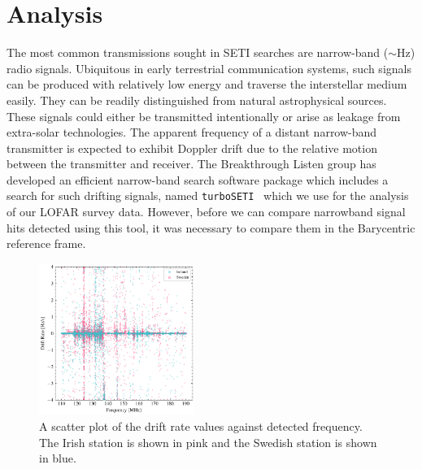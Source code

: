 \section{Analysis}
\label{sect:signal_types}
The most common transmissions sought in SETI searches are narrow-band ($\sim$Hz) radio signals. Ubiquitous in early terrestrial communication systems, such signals can be produced with relatively low energy and traverse the interstellar medium easily. They can be readily distinguished from natural astrophysical sources. These signals could either be transmitted intentionally or arise as leakage from extra-solar technologies. The apparent frequency of a distant narrow-band transmitter is expected to exhibit Doppler drift due to the relative motion between the transmitter and receiver. 
The Breakthrough Listen group has developed an efficient narrow-band search software package which includes a search for such drifting signals, named \verb|turboSETI|~\citep{Enriquez:2017} which we use for the analysis of our LOFAR survey data. However, before we can compare narrowband signal hits detected using this tool, it was necessary to compare them in the Barycentric reference frame. 

\begin{figure}
    \centering
    \includegraphics[width = 0.45\textwidth]{SETI/figures/narrowband/DR_scatter_plot.pdf}
    \caption{A scatter plot of the drift rate values against detected frequency. The Irish station is shown in pink and the Swedish station is shown in blue.}
    \label{fig:scatter_DR}
\end{figure}

